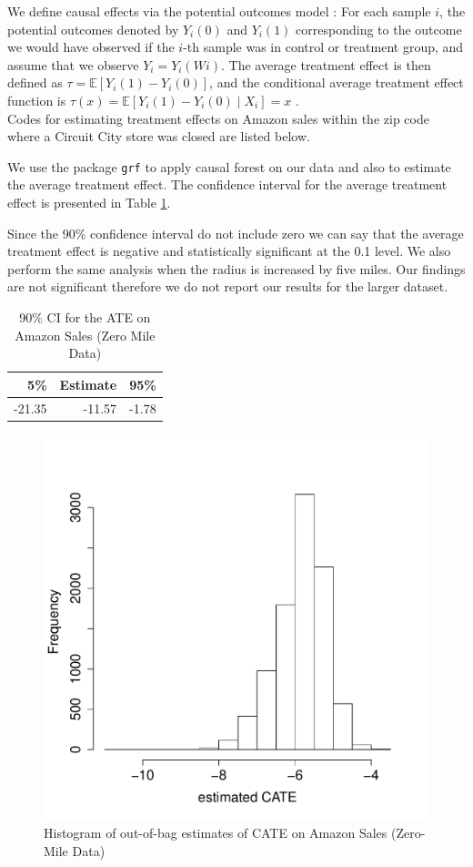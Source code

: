 \documentclass{article}
\begin{document}
We define causal effects via the potential outcomes model \cite{imbens2015causal}: For each sample $i$, the potential outcomes denoted by $Y_i(0)$ and $Y_i(1)$ corresponding to the outcome we would have observed  if the $i$-th sample was in control or treatment group, and assume that we observe $Y_i =Y_i(Wi)$.
The average treatment effect is then defined as 
$\tau = \mathbb{E} [Y_i(1)-Y_i(0)]$, and the conditional average
treatment effect function is 
$\tau(x)=\mathbb{E}[ Y_i(1)-Y_i(0)\mid X_i] =x$ .\\

Codes for estimating treatment effects  on Amazon sales within the zip code where a Circuit City store was closed are listed below.


We use the package \texttt{grf} \cite{tibshirani2018package} to apply causal forest on our data and also to estimate the average treatment effect. The confidence interval for the average treatment effect is presented in Table \ref{tab:ama_cf1_ate}. 

Since the 90\% confidence interval do not include zero we can say that the average treatment effect is negative and statistically significant at the 0.1 level. We also perform the same analysis when the radius is increased by five miles. Our findings are not significant therefore we do not report our results for the larger dataset.

\begin{table}[h]
\caption{90\% CI for the ATE on Amazon Sales (Zero Mile Data)} 
\label{tab:ama_cf1_ate}
\vspace{1em}
\centering
\begin{tabular}{rrr}
  \hline
 5\%  & Estimate & 95\% \\ 
  \hline
 -21.35 & -11.57 & -1.78 \\ 
   \hline
\end{tabular}
\end{table}

\begin{figure}[h]
\centering
\includegraphics[width=0.5\linewidth]{figures/tauhat1_ama_hist.pdf}\caption{Histogram of out-of-bag estimates of CATE  on Amazon Sales (Zero-Mile Data)}\label{fig:tauhat1_ama_hist}
\end{figure}
\end{document}
